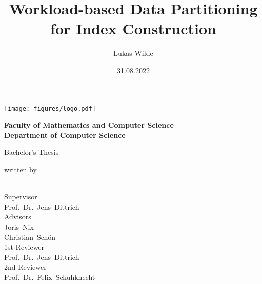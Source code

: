 \documentclass[11pt,a4paper,twoside,titlepage,british]{report}
\author{Lukas Wilde}
\date{31.08.2022}
\title{Workload-based Data Partitioning for Index Construction}
\makeatletter
\theoremstyle{definition}
\let\runauthor\@author
\let\runtitle\@title
\let\rundate\@date
\makeatother
\begin{document}
\begin{titlepage}
    \begin{center}
        \texttt{[image: figures/logo.pdf]}

        \bfseries
        \vspace{2em}
        Faculty of Mathematics and Computer Science \\
        Department of Computer Science

        \vspace{2cm}
        \begin{doublespace}
            {\LARGE \runtitle}
        \end{doublespace}

        \vspace{1cm} 
        {\large Bachelor's Thesis}

        \vfill
        {\normalfont written by}
        \\[1em]
        {\Large \runauthor}
        \\[1em]
        \textbf{\printdate{\rundate}}

        \vfill
        {\normalfont Supervisor}
        \\
        {\large Prof.~Dr.~Jens~Dittrich}
        \\[.5em]
        {\normalfont Advisors}
        \\
        {\large Joris~Nix}
        \\
        {\large Christian~Schön}
        \\[.5em]
        {\normalfont 1st Reviewer}
        \\
        {\large Prof.~Dr.~Jens~Dittrich}
        \\[.5em]
        {\normalfont 2nd Reviewer}
        \\
        {\large Prof.~Dr.~Felix~Schuhknecht}
    \end{center}
\end{titlepage}
\setcounter{page}{2}


\cleardoublepage




\clearpage

\end{document}
